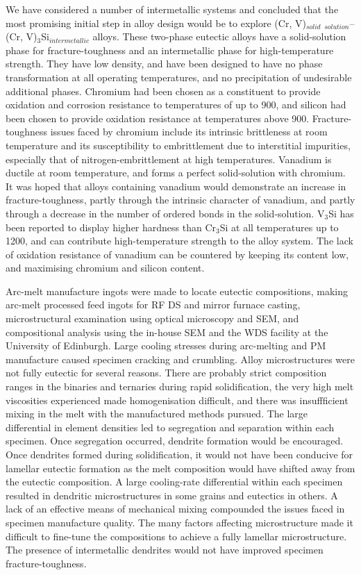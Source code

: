 We have considered a number of intermetallic systems and concluded that the most promising initial step in alloy design would be to explore (Cr, V)$_{solid}$ $_{solution}$--(Cr, V)$_3$Si$_{intermetallic}$ alloys.  These two-phase eutectic alloys have a solid-solution phase for fracture-toughness and an intermetallic phase for high-temperature strength.  They have low density, and have been designed to have no phase transformation at all operating temperatures, and no precipitation of undesirable additional phases.  Chromium had been chosen as a constituent to provide oxidation and corrosion resistance to temperatures of up to 900\celsius, and silicon had been chosen to provide oxidation resistance at temperatures above 900\celsius.  Fracture-toughness issues faced by chromium include its intrinsic brittleness at room temperature and its susceptibility to embrittlement due to interstitial impurities, especially that of nitrogen-embrittlement at high temperatures.  Vanadium is ductile at room temperature, and forms a perfect solid-solution with chromium.  It was hoped that alloys containing vanadium would demonstrate an increase in fracture-toughness, partly through the intrinsic character of vanadium, and partly through a decrease in the number of ordered bonds in the solid-solution.  V$_3$Si has been reported to display higher hardness than Cr$_3$Si at all temperatures up to 1200\celsius, and can contribute high-temperature strength to the alloy system.  The lack of oxidation resistance of vanadium can be countered by keeping its content low, and maximising chromium and silicon content.

Arc-melt manufacture ingots were made to locate eutectic compositions, making arc-melt processed feed ingots for RF DS and mirror furnace casting, microstructural examination using optical microscopy and SEM, and compositional analysis using the in-house SEM and the WDS facility at the University of Edinburgh.  Large cooling stresses during arc-melting and PM manufacture caused specimen cracking and crumbling.  Alloy microstructures were not fully eutectic for several reasons.  There are probably strict composition ranges in the binaries and ternaries during rapid solidification, the very high melt viscosities experienced made homogenisation difficult, and there was insuffficient mixing in the melt with the manufactured methods pursued.  The large differential in element densities led to segregation and separation within each specimen.  Once segregation occurred, dendrite formation would be encouraged.  Once dendrites formed during solidification, it would not have been conducive for lamellar eutectic formation as the melt composition would have shifted away from the eutectic composition.  A large cooling-rate differential within each specimen resulted in dendritic microstructures in some grains and eutectics in others.  A lack of an effective means of mechanical mixing compounded the issues faced in specimen manufacture quality.  The many factors affecting microstructure made it difficult to fine-tune the compositions to achieve a fully lamellar microstructure.  The presence of intermetallic dendrites would not have improved specimen fracture-toughness.

